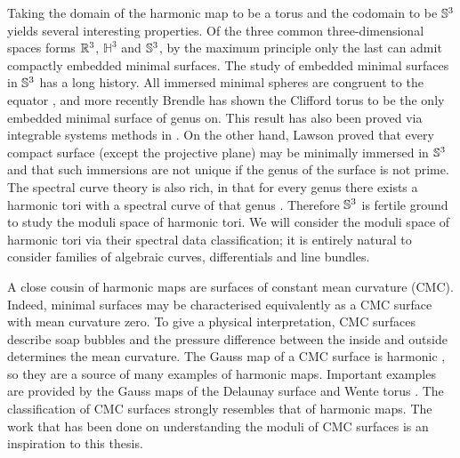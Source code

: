 Taking the domain of the harmonic map to be a torus and the codomain to be $\S^3$ yields several interesting properties. Of the three common three-dimensional spaces forms $\R^3$, $\mathbb{H}^3$ and $\S^3$, by the maximum principle only the last can admit compactly embedded minimal surfaces. The study of embedded minimal surfaces in $\S^3$ has a long history. All immersed minimal spheres are congruent to the equator \cite{Almgren1966}, and more recently Brendle \cite{Brendle2013} has shown the Clifford torus to be the only embedded minimal surface of genus on. This result has also been proved via integrable systems methods in \cite{Hauswirth2015,Hauswirth2016}. On the other hand, Lawson \cite{Lawson1970} proved that every compact surface (except the projective plane) may be minimally immersed in $\S^3$ and that such immersions are not unique if the genus of the surface is not prime. The spectral curve theory is also rich, in that for every genus there exists a harmonic tori with a spectral curve of that genus \cite{Carberry2007}.
Therefore $\S^3$ is fertile ground to study the moduli space of harmonic tori. We will consider the moduli space of harmonic tori via their spectral data classification; it is entirely natural to consider families of algebraic curves, differentials and line bundles.

A close cousin of harmonic maps are surfaces of constant mean curvature (CMC). Indeed, minimal surfaces may be characterised equivalently as a CMC surface with mean curvature zero. To give a physical interpretation, CMC surfaces describe soap bubbles and the pressure difference between the inside and outside determines the mean curvature. The Gauss map of a CMC surface is harmonic \cite{Ruh1970}, so they are a source of many examples of harmonic maps. Important examples are provided by the Gauss maps of the Delaunay surface \cite{Delaunay1841} and Wente torus \cite{Wente1986}. The classification of CMC surfaces \cite{Sterling1989,Bobenko1991} strongly resembles that of harmonic maps. The work that has been done on understanding the moduli of CMC surfaces \cite{Hauswirth2016,Kilian2015a,Carberry2016} is an inspiration to this thesis.

